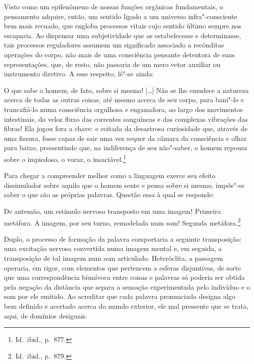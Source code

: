 Visto como um epifenômeno de nossas funções orgânicas fundamentais, o
pensamento adquire, então, um sentido ligado a um universo
infra"-consciente bem mais recuado, que engloba processos vitais cujo
sentido último sempre nos escaparia. Ao dispensar uma subjetividade que
os estabelecesse e determinasse, tais processos reguladores assumem
um significado associado a recônditas operações do corpo, não mais de
uma consciência pensante detentora de suas representações, que, de
resto, não passaria de um mero vetor auxiliar ou instrumento diretivo.
A esse respeito, lê"-se ainda:

\begin{hedraquote}
O que sabe o homem, de fato, sobre si mesmo! [\ldots{}] Não se lhe emudece
a natureza acerca de todas as outras coisas, até mesmo acerca de seu
corpo, para bani"-lo e trancafiá{}-lo numa consciência orgulhosa e
enganadora, ao largo dos movimentos intestinais, do veloz fluxo das
correntes sanguíneas e das complexas vibrações das fibras! Ela jogou
fora a chave: e coitada da desastrosa curiosidade que, através de uma
fissura, fosse capaz de sair uma vez sequer da câmara da consciência e
olhar para baixo, pressentindo que, na indiferença de seu não"-saber,
o homem repousa sobre o impiedoso, o voraz, o
insaciável.\footnote{ Id.~ibid., p.~877.}
\end{hedraquote}

Para chegar a compreender melhor como a linguagem exerce seu efeito
dissimulador sobre aquilo que o homem sente e pensa sobre si mesmo,
impõe"-se saber o que são as próprias palavras. Questão essa à qual se
responde: 

\begin{hedraquote}
De antemão, um estímulo nervoso transposto em uma imagem!
Primeira metáfora. A imagem, por seu turno, remodelada num som! Segunda
metáfora.\footnote{ Id.~ibid., p.~879.} 
\end{hedraquote}

Duplo, o processo de formação
da palavra comportaria a seguinte transposição: uma excitação nervosa
convertida numa imagem mental e, em seguida, a transposição de tal
imagem num som articulado. Heteróclita, a passagem operaria, em rigor,
com elementos que pertencem a esferas disjuntivas, de sorte
que uma correspondência biunívoca entre coisas e palavras só poderia
ser obtida pela negação da distância que separa a sensação
experimentada pelo indivíduo e o som por ele emitido. Ao acreditar que
cada palavra pronunciada designa algo bem definido e acertado acerca do
mundo exterior, ele mal pressente que se trata, aqui, de domínios desiguais.

